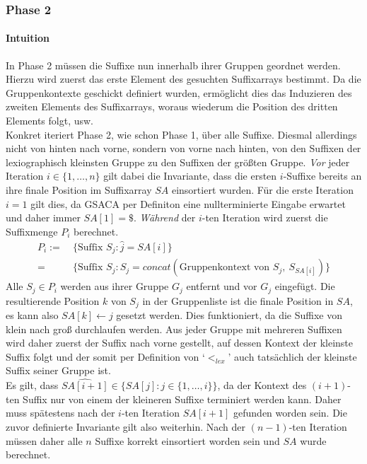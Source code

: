 \documentclass[twoside,a4paper,11pt]{article}
\theoremstyle{break}
\begin{document}
\subsubsection{Phase 2}

\paragraph{Intuition} In Phase 2 müssen die Suffixe nun innerhalb ihrer Gruppen geordnet werden. Hierzu wird zuerst das erste Element des gesuchten Suffixarrays bestimmt. Da die Gruppenkontexte geschickt definiert wurden, ermöglicht dies das Induzieren des zweiten Elements des Suffixarrays, woraus wiederum die Position des dritten Elements folgt, usw. \\

Konkret iteriert Phase 2, wie schon Phase 1, über alle Suffixe. Diesmal allerdings nicht von hinten nach vorne, sondern von vorne nach hinten, von den Suffixen der lexiographisch kleinsten Gruppe zu den Suffixen der größten Gruppe. \textit{Vor} jeder Iteration $i \in \{ 1, \dots, n \}$ gilt dabei die Invariante, dass die ersten $i$-Suffixe bereits an ihre finale Position im Suffixarray $SA$ einsortiert wurden. Für die erste Iteration $i = 1$ gilt dies, da GSACA per Definiton eine nullterminierte Eingabe erwartet und daher immer $SA[1] = \$$. \textit{Während} der $i$-ten Iteration wird zuerst die Suffixmenge $P_i$ berechnet.
\begin{align*}
	P_i :=\ & \{ \text{Suffix } S_j: \widehat{j} = SA[i] \} \\
	=\ & \{ \text{Suffix } S_j: S_j = concat(\text{Gruppenkontext von } S_j,\ S_{SA[i]}) \}
\end{align*}
Alle $S_j \in P_i$ werden aus ihrer Gruppe $G_j$ entfernt und vor $G_j$ eingefügt. Die resultierende Position $k$ von $S_j$ in der Gruppenliste ist die finale Position in $SA$, es kann also $SA[k] \leftarrow j$ gesetzt werden. Dies funktioniert, da die Suffixe von klein nach groß durchlaufen werden. Aus jeder Gruppe mit mehreren Suffixen wird daher zuerst der Suffix nach vorne gestellt, auf dessen Kontext der kleinste Suffix folgt und der somit per Definition von `$<_{lex}$' auch tatsächlich der kleinste Suffix seiner Gruppe ist. \\

Es gilt, dass $\widehat{SA[i + 1]} \in \{ SA[j]: j \in \{ 1, \dots, i \} \}$, da der Kontext des $(i + 1)$-ten Suffix nur von einem der kleineren Suffixe terminiert werden kann. Daher muss spätestens nach der $i$-ten Iteration $SA[i + 1]$ gefunden worden sein. Die zuvor definierte Invariante gilt also weiterhin. Nach der $(n - 1)$-ten Iteration müssen daher alle $n$ Suffixe korrekt einsortiert worden sein und $SA$ wurde berechnet.
\end{document}
